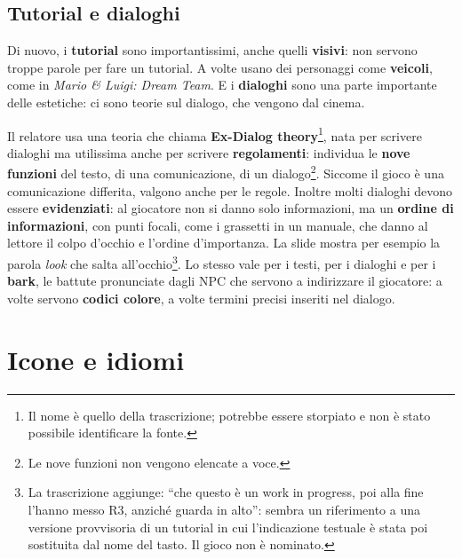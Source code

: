 \subsection{Tutorial e dialoghi}

Di nuovo, i \textbf{tutorial} sono importantissimi, anche quelli
\textbf{visivi}: non servono troppe parole per fare un tutorial. A volte usano
dei personaggi come \textbf{veicoli}, come in \emph{Mario \& Luigi: Dream Team}.
E i \textbf{dialoghi} sono una parte importante delle estetiche: ci sono teorie
sul dialogo, che vengono dal cinema.

Il relatore usa una teoria che chiama \textbf{Ex-Dialog theory}\footnote{Il nome
è quello della trascrizione; potrebbe essere storpiato e non è stato possibile
identificare la fonte.}, nata per scrivere dialoghi ma utilissima anche per
scrivere \textbf{regolamenti}: individua le \textbf{nove funzioni} del testo, di
una comunicazione, di un dialogo\footnote{Le nove funzioni non vengono elencate
a voce.}. Siccome il gioco è una comunicazione differita, valgono anche per le
regole. Inoltre molti dialoghi devono essere \textbf{evidenziati}: al giocatore
non si danno solo informazioni, ma un \textbf{ordine di informazioni}, con punti
focali, come i grassetti in un manuale, che danno al lettore il colpo d'occhio e
l'ordine d'importanza. La slide mostra per esempio la parola \emph{look} che
salta all'occhio\footnote{La trascrizione aggiunge: ``che questo è un work in
progress, poi alla fine l'hanno messo R3, anziché guarda in alto'': sembra un
riferimento a una versione provvisoria di un tutorial in cui l'indicazione
testuale è stata poi sostituita dal nome del tasto. Il gioco non è nominato.}.
Lo stesso vale per i testi, per i dialoghi e per i \textbf{bark}, le battute
pronunciate dagli NPC che servono a indirizzare il giocatore: a volte servono
\textbf{codici colore}, a volte termini precisi inseriti nel dialogo.

\section{Icone e idiomi}
\label{sec:z6-icone-idiomi}

